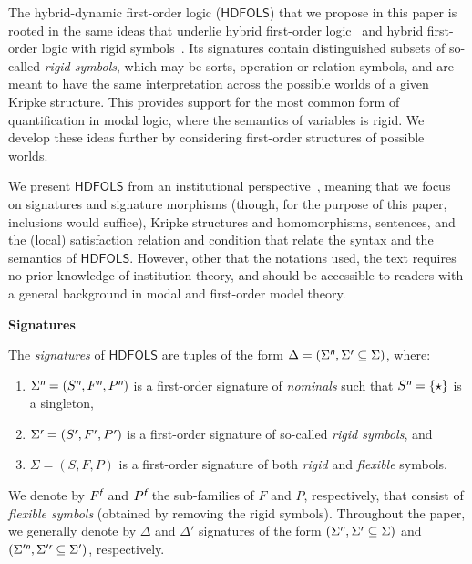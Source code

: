 \documentclass[a4paper,UKenglish,cleveref, autoref]{lipics-v2019}
\newcommand{\HDFOLS}{{\mathsf{HDFOLS}}}
\newcommand{\keyscript}[1]{\text{\normalfont\sffamily\itshape #1}}
\newcommand{\nominal}{\keyscript{n}}
\newcommand{\rigid}{\keyscript{r}}
\newcommand{\flexible}{\keyscript{f}}
\newcommand{\minisec}[1]{%
  \par\addvspace{\smallskipamount}\noindent%
  \textbf{\sffamily #1}\enspace%
}
\begin{document}
The hybrid-dynamic first-order logic (\(\HDFOLS\)) that we propose in this paper is rooted in the same ideas that underlie hybrid first-order logic~\cite{Brauner11} and hybrid first-order logic with rigid symbols~\cite{DiaconescuM16,Diaconescu16}. 
Its signatures contain distinguished subsets of so-called \emph{rigid symbols}, which may be sorts, operation or relation symbols, and are meant to have the same interpretation across the possible worlds of a given Kripke structure.
This provides support for the most common form of quantification in modal logic, where the semantics of variables is rigid.
We develop these ideas further by considering first-order structures of possible worlds.

We present \(\HDFOLS\) from an institutional perspective~\cite{GoguenB92}, meaning that we focus on signatures and signature morphisms (though, for the purpose of this paper, inclusions would suffice), Kripke structures and homomorphisms, sentences, and the (local) satisfaction relation and condition that relate the syntax and the semantics of \(\HDFOLS\).
However, other that the notations used, the text requires no prior knowledge of institution theory, and should be accessible to readers with a general background in modal and first-order model theory.

\minisec{Signatures}
The \emph{signatures} of \(\HDFOLS\) are tuples of the form \(\Delta = (\Sigma^{\nominal}, \Sigma^{\rigid} \subseteq \Sigma)\), where:
\begin{enumerate}
  
\item \(\Sigma^{\nominal} = (S^{\nominal}, F^{\nominal}, P^{\nominal})\) is a first-order signature of \emph{nominals} such that \(S^{\nominal} = \{\star\}\) is a singleton,

\item \(\Sigma^{\rigid} = (S^{\rigid}, F^{\rigid}, P^{\rigid})\) is a first-order signature of so-called \emph{rigid symbols}, and

\item \(\Sigma = (S, F, P)\) is a first-order signature of both \emph{rigid} and \emph{flexible} symbols.
  
\end{enumerate}
We denote by \(F^{\flexible}\) and \(P^{\flexible}\) the sub-families of \(F\) and \(P\), respectively, that consist of \emph{flexible symbols} (obtained by removing the rigid symbols).
Throughout the paper, we generally denote by \(\Delta\) and \(\Delta'\) signatures of the form \((\Sigma^{\nominal}, \Sigma^{\rigid} \subseteq \Sigma)\) and \((\Sigma'^{\nominal}, \Sigma'^{\rigid} \subseteq \Sigma')\), respectively.
\end{document}
